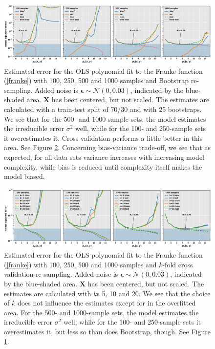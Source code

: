 \documentclass[]{article}
\begin{document}
\begin{figure}[!htb]
	\centering
	\includegraphics[width=1\linewidth]{./results/ols-bootstrap.png}
	\caption{Estimated error for the OLS polynomial fit to the Franke function (\ref{franke}) with 100, 250, 500 and 1000 samples and Bootstrap re-sampling. Added noise is $\mathbf{\epsilon} \sim \mathcal{N}(0, 0.03)$, indicated by the blue-shaded area. $\mathbf{X}$ has been centered, but not scaled. The estimates are calculated with a train-test split of 70/30 and with 25 bootstraps. We see that for the 500- and 1000-sample sets, the model estimates the irreducible error $\sigma^2$ well, while for the 100- and 250-sample sets it overestimates it. Cross validation performs a little better in this area. See Figure \ref{fig:ols-cv}. Concerning bias-variance trade-off, we see that as expected, for all data sets variance increases with increasing model complexity, while bias is reduced until complexity itself makes the model biased.}
	\label{fig:ols-bootstrap}
\end{figure}

\begin{figure}[!htb]
	\centering
	\includegraphics[width=1\linewidth]{./results/ols-cv.png}
	\caption{Estimated error for the OLS polynomial fit to the Franke function (\ref{franke}) with 100, 250, 500 and 1000 samples and $k$-fold cross validation re-sampling. Added noise is $\mathbf{\epsilon} \sim \mathcal{N}(0, 0.03)$, indicated by the blue-shaded area. $\mathbf{X}$ has been centered, but not scaled. The estimates are calculated with $k$s 5, 10 and 20. We see that the choice of $k$ does not influence the estimates except for in the overfitted area. For the 500- and 1000-sample sets, the model estimates the irreducible error $\sigma^2$ well, while for the 100- and 250-sample sets it overestimates it, but less so than does Bootstrap, though. See Figure \ref{fig:ols-bootstrap}.}
	\label{fig:ols-cv}
\end{figure}
\end{document}
